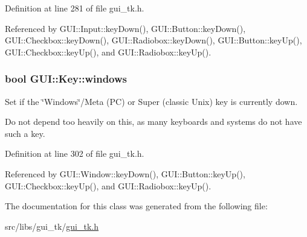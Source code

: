 Definition at line 281 of file gui\-\_\-tk.\-h.



Referenced by G\-U\-I\-::\-Input\-::key\-Down(), G\-U\-I\-::\-Button\-::key\-Down(), G\-U\-I\-::\-Checkbox\-::key\-Down(), G\-U\-I\-::\-Radiobox\-::key\-Down(), G\-U\-I\-::\-Button\-::key\-Up(), G\-U\-I\-::\-Checkbox\-::key\-Up(), and G\-U\-I\-::\-Radiobox\-::key\-Up().

\hypertarget{classGUI_1_1Key_abc017c8f165f2b4c857c757ef413da3c}{
\subsubsection[{windows}]{\setlength{\rightskip}{0pt plus 5cm}bool {\bf G\-U\-I\-::\-Key\-::windows}}}\label{classGUI_1_1Key_abc017c8f165f2b4c857c757ef413da3c}


Set if the \char`\"{}\-Windows\char`\"{}/\-Meta (P\-C) or Super (classic Unix) key is currently down. 

Do not depend too heavily on this, as many keyboards and systems do not have such a key. 

Definition at line 302 of file gui\-\_\-tk.\-h.



Referenced by G\-U\-I\-::\-Window\-::key\-Down(), G\-U\-I\-::\-Button\-::key\-Up(), G\-U\-I\-::\-Checkbox\-::key\-Up(), and G\-U\-I\-::\-Radiobox\-::key\-Up().



The documentation for this class was generated from the following file\-:\begin{DoxyCompactItemize}
\item 
src/libs/gui\-\_\-tk/\hyperlink{gui__tk_8h}{gui\-\_\-tk.\-h}\end{DoxyCompactItemize}
